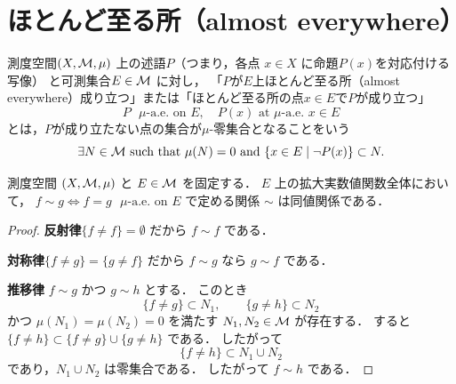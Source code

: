 \section{ほとんど至る所（almost everywhere）}

\begin{definition}\label{def:ae-prop}
    測度空間$(X,\mathcal M,\mu)$ 上の述語$P$（つまり，各点 $x \in X$ に命題$P(x)$を対応付ける写像）
    と可測集合$E \in \mathcal M$ に対し，
    「$P$が$E$上ほとんど至る所（almost everywhere）成り立つ」または「ほとんど至る所の点$x \in E$で$P$が成り立つ」
    \[
    P \text{ $\mu$-a.e.\ on } E, \quad P(x) \text{ at $\mu$-a.e. } x \in E
    \]
    とは，$P$が成り立たない点の集合が$\mu$-零集合となることをいう
    \[
    \exists N \in \mathcal M \text{ such that } \mu(N)=0 \text{ and }
    \{ x \in E \mid \neg P(x) \} \subset N.
    \]
\end{definition}

\begin{proposition}\label{prop:ae-equality-equivalence}
測度空間 $(X,\mathcal M,\mu)$ と $E\in\mathcal M$ を固定する．
$E$ 上の拡大実数値関数全体において，
$f\sim g \iff f=g \text{ $\mu$-a.e.\ on } E$
で定める関係 $\sim$ は同値関係である．
\end{proposition}
\begin{proof}
\textbf{反射律}\quad $\{f\ne f\}=\emptyset$ だから $f\sim f$ である．

\textbf{対称律}\quad $\{f\ne g\}=\{g\ne f\}$ だから $f\sim g$ なら $g\sim f$ である．

\textbf{推移律}\quad
$f\sim g$ かつ $g\sim h$ とする．
このとき
\[
\{f\ne g\}\subset N_1,\qquad
\{g\ne h\}\subset N_2
\]
かつ $\mu(N_1)=\mu(N_2)=0$ を満たす $N_1,N_2\in\mathcal M$ が存在する．
すると $\{f\ne h\}\subset \{f\ne g\}\cup\{g\ne h\}$ である．
したがって
\[
\{f\ne h\}\subset N_1\cup N_2
\]
であり，$N_1\cup N_2$ は零集合である．
したがって $f\sim h$ である．
\end{proof}

